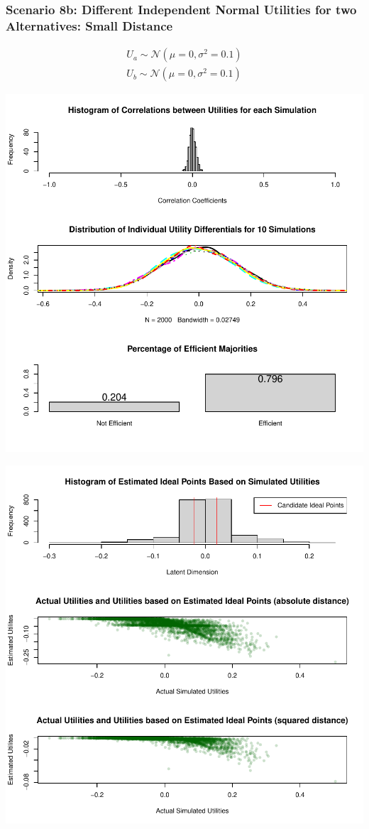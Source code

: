 \documentclass[12pt]{article}\usepackage[]{graphicx}\usepackage[]{color}
\makeatletter
\def\maxwidth{ %
  \ifdim\Gin@nat@width>\linewidth
    \linewidth
  \else
    \Gin@nat@width
  \fi
}
\newenvironment{knitrout}{}{} %
\makeatother
\begin{document}
\clearpage
\subsubsection*{Scenario 8b: Different Independent Normal Utilities for two Alternatives: Small Distance}

\begin{align*}
U_a \sim \mathcal{N}(\mu=0,\sigma^2=0.1)\\
U_b \sim \mathcal{N}(\mu=0,\sigma^2=0.1)
\end{align*}

\begin{knitrout}
\color{fgcolor}
\includegraphics[width=\maxwidth]{figure/unnamed-chunk-161} 

\includegraphics[width=\maxwidth]{figure/unnamed-chunk-162} 


\end{knitrout}
\end{document}
